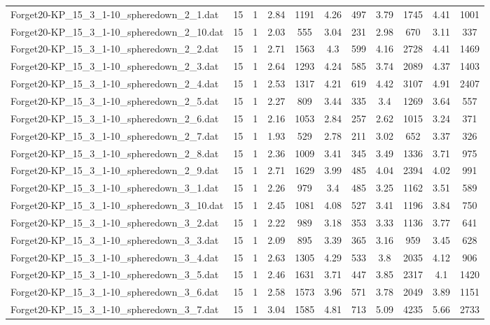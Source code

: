 \begin{table}[!ht]
\begin{tabular}{lcccccccccc}
Forget20-KP\_15\_3\_1-10\_spheredown\_2\_1.dat & 15 & 1 & 2.84 & 1191 & 4.26 & 497 & 3.79 & 1745 & 4.41 & 1001 \\
Forget20-KP\_15\_3\_1-10\_spheredown\_2\_10.dat & 15 & 1 & 2.03 & 555 & 3.04 & 231 & 2.98 & 670 & 3.11 & 337 \\
Forget20-KP\_15\_3\_1-10\_spheredown\_2\_2.dat & 15 & 1 & 2.71 & 1563 & 4.3 & 599 & 4.16 & 2728 & 4.41 & 1469 \\
Forget20-KP\_15\_3\_1-10\_spheredown\_2\_3.dat & 15 & 1 & 2.64 & 1293 & 4.24 & 585 & 3.74 & 2089 & 4.37 & 1403 \\
Forget20-KP\_15\_3\_1-10\_spheredown\_2\_4.dat & 15 & 1 & 2.53 & 1317 & 4.21 & 619 & 4.42 & 3107 & 4.91 & 2407 \\
Forget20-KP\_15\_3\_1-10\_spheredown\_2\_5.dat & 15 & 1 & 2.27 & 809 & 3.44 & 335 & 3.4 & 1269 & 3.64 & 557 \\
Forget20-KP\_15\_3\_1-10\_spheredown\_2\_6.dat & 15 & 1 & 2.16 & 1053 & 2.84 & 257 & 2.62 & 1015 & 3.24 & 371 \\
Forget20-KP\_15\_3\_1-10\_spheredown\_2\_7.dat & 15 & 1 & 1.93 & 529 & 2.78 & 211 & 3.02 & 652 & 3.37 & 326 \\
Forget20-KP\_15\_3\_1-10\_spheredown\_2\_8.dat & 15 & 1 & 2.36 & 1009 & 3.41 & 345 & 3.49 & 1336 & 3.71 & 975 \\
Forget20-KP\_15\_3\_1-10\_spheredown\_2\_9.dat & 15 & 1 & 2.71 & 1629 & 3.99 & 485 & 4.04 & 2394 & 4.02 & 991 \\
Forget20-KP\_15\_3\_1-10\_spheredown\_3\_1.dat & 15 & 1 & 2.26 & 979 & 3.4 & 485 & 3.25 & 1162 & 3.51 & 589 \\
Forget20-KP\_15\_3\_1-10\_spheredown\_3\_10.dat & 15 & 1 & 2.45 & 1081 & 4.08 & 527 & 3.41 & 1196 & 3.84 & 750 \\
Forget20-KP\_15\_3\_1-10\_spheredown\_3\_2.dat & 15 & 1 & 2.22 & 989 & 3.18 & 353 & 3.33 & 1136 & 3.77 & 641 \\
Forget20-KP\_15\_3\_1-10\_spheredown\_3\_3.dat & 15 & 1 & 2.09 & 895 & 3.39 & 365 & 3.16 & 959 & 3.45 & 628 \\
Forget20-KP\_15\_3\_1-10\_spheredown\_3\_4.dat & 15 & 1 & 2.63 & 1305 & 4.29 & 533 & 3.8 & 2035 & 4.12 & 906 \\
Forget20-KP\_15\_3\_1-10\_spheredown\_3\_5.dat & 15 & 1 & 2.46 & 1631 & 3.71 & 447 & 3.85 & 2317 & 4.1 & 1420 \\
Forget20-KP\_15\_3\_1-10\_spheredown\_3\_6.dat & 15 & 1 & 2.58 & 1573 & 3.96 & 571 & 3.78 & 2049 & 3.89 & 1151 \\
Forget20-KP\_15\_3\_1-10\_spheredown\_3\_7.dat & 15 & 1 & 3.04 & 1585 & 4.81 & 713 & 5.09 & 4235 & 5.66 & 2733 \\

\end{tabular}
\end{table}

